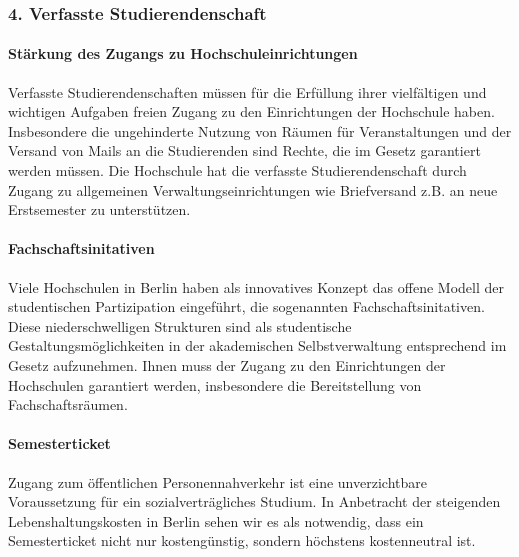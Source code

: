 \documentclass[DIV=calc]{scrartcl}
\begin{document}
\hypertarget{verfasste-studierendenschaft}{%
\subsubsection*{4. Verfasste Studierendenschaft}\label{verfasste-studierendenschaft}}

\hypertarget{stuxe4rkung-des-zugangs-zu-hochschuleinrichtungen}{%
\paragraph{Stärkung des Zugangs zu Hochschuleinrichtungen}\label{stuxe4rkung-des-zugangs-zu-hochschuleinrichtungen}}

Verfasste Studierendenschaften müssen für die Erfüllung ihrer
vielfältigen und wichtigen Aufgaben freien Zugang zu den Einrichtungen der Hochschule haben. Insbesondere die ungehinderte Nutzung von Räumen für Veranstaltungen und der Versand von Mails an die Studierenden sind Rechte, die im Gesetz garantiert werden müssen. Die Hochschule hat die verfasste Studierendenschaft durch Zugang zu allgemeinen Verwaltungseinrichtungen wie Briefversand z.B. an neue Erstsemester zu unterstützen.

\hypertarget{fachschaftsinitativen}{%
\paragraph{Fachschaftsinitativen}\label{fachschaftsinitativen}}

Viele Hochschulen in Berlin haben als innovatives Konzept das offene Modell der studentischen Partizipation eingeführt, die sogenannten Fachschaftsinitativen. Diese niederschwelligen Strukturen sind als studentische Gestaltungsmöglichkeiten in der akademischen Selbstverwaltung entsprechend im Gesetz aufzunehmen. Ihnen muss der Zugang zu den Einrichtungen der Hochschulen garantiert werden, insbesondere die Bereitstellung von Fachschaftsräumen.

\hypertarget{semesterticket}{%
\paragraph{Semesterticket}\label{semesterticket}}

Zugang zum öffentlichen Personennahverkehr ist eine unverzichtbare Voraussetzung für ein sozialverträgliches Studium. In Anbetracht der steigenden Lebenshaltungskosten in Berlin sehen wir es als notwendig, dass ein Semesterticket nicht nur kostengünstig, sondern höchstens kostenneutral ist.
\end{document}

